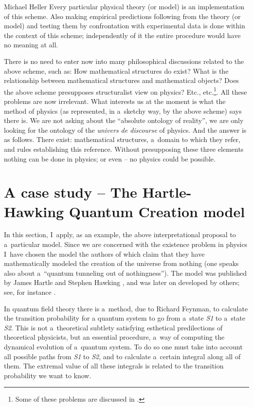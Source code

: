 \begin{artengenv}{Michael Heller}
Every particular physical theory (or model) is an implementation of this scheme. Also making empirical predictions
following from the theory (or model) and testing them by confrontation with experimental data is done within the
context of this scheme; independently of it the entire procedure would have no meaning at all.

There is no need to enter now into many philosophical discussions related to the above scheme, such as: How mathematical
structures do exist? What is the relationship between mathematical structures and mathematical objects? Does the above
scheme presupposes structuralist view on physics? Etc., etc.\footnote{Some of these problems are discussed in
\parencite{heller_discovering_2006}.}. All these problems are now irrelevant. What interests us at the moment is
what the method of physics (as represented, in a~sketchy way, by the above scheme) says there is. We are not asking
about the ``absolute ontology of reality'', we are only looking for the ontology of the \textit{univers de discourse} of
physics. And the answer is as follows. There exist: mathematical structures, a~domain to which they refer, and rules
establishing this reference. Without presupposing these three elements nothing can be done in physics; or even – no
physics could be possible.

\section{A case study -- The Hartle-Hawking Quantum Creation model}
In this section, I~apply, as an example, the above interpretational proposal to a~particular model. Since we are
concerned with the existence problem in physics I~have chosen the model the authors of which claim that they have
mathematically modeled the creation of the universe from nothing (one speaks also about a~``quantum tunneling out of
nothingness''). The model was published by James Hartle and Stephen Hawking \parencite*{hartle_wave_1983},
and was later on developed by others; see, for instance \parencite{wu_zhong_no-boundary_1993}.

In quantum field theory there is a~method, due to Richard Feynman, to calculate the transition probability for a
quantum system to go from a~state \textit{S1} to a~state \textit{S2}. This is not a~theoretical subtlety satisfying
esthetical predilections of theoretical physicists, but an essential procedure, a~way of computing the dynamical
evolution of a~quantum system. To do so one must take into account all possible paths from \textit{S1} to \textit{S2},
and to calculate a~certain integral along all of them. The extremal value of all these integrals is related to the
transition probability we want to know.


\end{artengenv}
